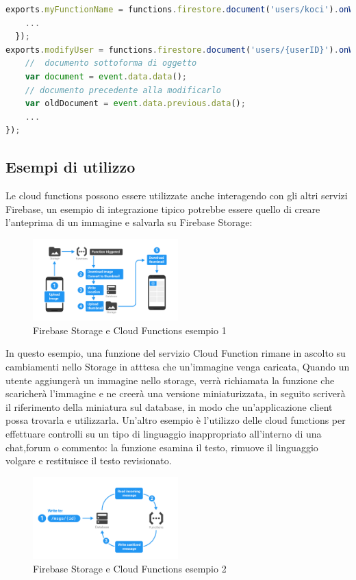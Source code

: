 \begin{lstlisting}[language=javascript,caption={Cloud functions esempio 1 }]
exports.myFunctionName = functions.firestore.document('users/koci').onWrite((event) => {
    ...
  });
exports.modifyUser = functions.firestore.document('users/{userID}').onWrite(event => {
    //  documento sottoforma di oggetto
    var document = event.data.data();
    // documento precedente alla modificarlo
    var oldDocument = event.data.previous.data();
    ...
});
\end{lstlisting}


\newpage              %
\subsection{Esempi di utilizzo}
Le cloud functions possono essere utilizzate anche interagendo con gli altri servizi Firebase, un esempio di integrazione tipico potrebbe essere quello di creare l'anteprima di un immagine e salvarla su Firebase Storage:

\begin{figure}[!h]
  \centering
  \includegraphics[width=0.5\textwidth]{immagini/functions_ex1.png}
  \caption{Firebase Storage e Cloud Functions esempio 1}\label{fig:Firebase Storage e Cloud Functions esempio 1}
\end{figure}

In questo esempio, una funzione del servizio Cloud Function rimane in ascolto su cambiamenti nello Storage in atttesa che un'immagine venga caricata, Quando un utente aggiungerà un immagine nello storage, verrà richiamata la funzione che scaricherà l'immagine e ne creerà una versione miniaturizzata, in seguito scriverà il riferimento della miniatura sul database, in modo che un'applicazione client possa trovarla e utilizzarla.
Un'altro esempio è l'utilizzo delle cloud functions per effettuare controlli su un tipo di linguaggio inappropriato all'interno di una chat,forum o commento:
la funzione esamina il testo, rimuove il linguaggio volgare e restituisce il testo revisionato.


\begin{figure}[!h]
\centering
  \includegraphics[width=0.5\textwidth]{immagini/functions_ex2.png}
  \caption{Firebase Storage e Cloud Functions esempio 2}
  \label{fig:Firebase Storage e Cloud Functions esempio 2}
\end{figure}


